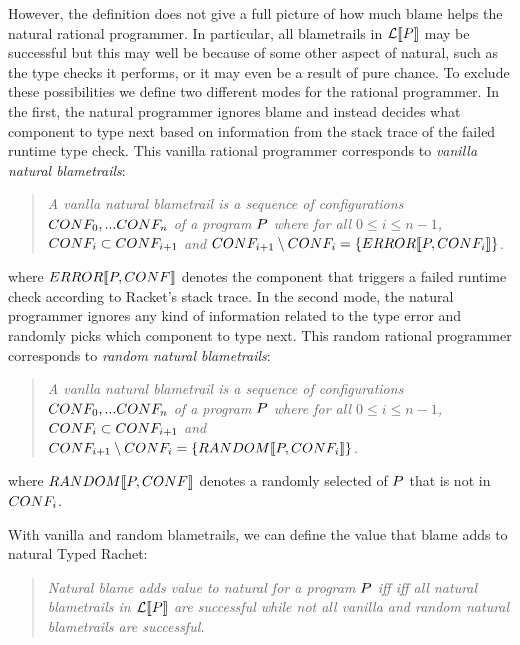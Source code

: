 However, the definition does not give a full picture of how much blame helps the
natural rational programmer. In particular, all blametrails in $\mathcal{L}\llbracket P\rrbracket$
may  be successful but this may well be because of some other aspect of
natural, such as the type checks it performs, or it may even be a result
of pure chance. To exclude these possibilities we define two different
modes for the rational programmer. In the first, the natural programmer
ignores blame and instead decides what component to type next based on
information from the stack trace of the failed runtime type check.  This 
vanilla rational programmer corresponds to \emph{vanilla natural
blametrails}:
\begin{quote}
\it 
A vanlla natural blametrail
is a sequence of configurations $CONF_0,...CONF_n$ of a program
$P$ where for all $0 \leq i \leq n - 1$, $CONF_i \subset CONF_{i+1}$ and
$CONF_{i+1} \setminus CONF_i = \{ERROR\llbracket P, CONF_i\rrbracket\}$.
\end{quote}
where $ERROR\llbracket P, CONF\rrbracket$ denotes the component that triggers a
failed runtime check according to Racket's stack trace. 
In the second mode, the natural programmer
ignores any kind of information related to the type error and randomly
picks which component to type next.  This 
random rational programmer corresponds to \emph{random natural
blametrails}:
\begin{quote}
\it 
A vanlla natural blametrail
is a sequence of configurations $CONF_0,...CONF_n$ of a program
$P$ where for all $0 \leq i \leq n - 1$, $CONF_i \subset CONF_{i+1}$ and
$CONF_{i+1} \setminus CONF_i = \{RANDOM\llbracket P, CONF_i\rrbracket\}$.
\end{quote}
where $RANDOM\llbracket P, CONF\rrbracket$ denotes a randomly selected of $P$
that is not in $CONF_i$.

With vanilla and random blametrails, we can define the value that blame
adds to natural Typed Rachet: 
\begin{quote}
\it
  Natural blame  adds value to natural for a program $P$ iff 
 iff 
  all natural blametrails in  $\mathcal{L}\llbracket P\rrbracket$ are successful while 
not all vanilla and random natural blametrails are successful.
\end{quote}


